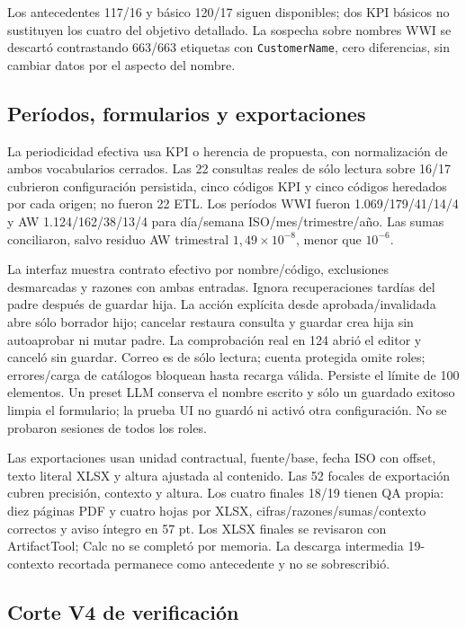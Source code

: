 \documentclass[11pt,letterpaper]{article}
\newcommand{\file}[1]{\texttt{#1}}
\begin{document}
Los antecedentes 117/16 y básico 120/17 siguen disponibles; dos KPI básicos no
sustituyen los cuatro del objetivo detallado. La sospecha sobre nombres WWI se
descartó contrastando 663/663 etiquetas con \file{CustomerName}, cero diferencias,
sin cambiar datos por el aspecto del nombre.

\subsection{Períodos, formularios y exportaciones}

La periodicidad efectiva usa KPI o herencia de propuesta, con normalización de
ambos vocabularios cerrados. Las 22 consultas reales de sólo lectura sobre 16/17
cubrieron configuración persistida, cinco códigos KPI y cinco códigos heredados
por cada origen; no fueron 22 ETL. Los períodos WWI fueron 1.069/179/41/14/4 y AW
1.124/162/38/13/4 para día/semana ISO/mes/trimestre/año. Las sumas conciliaron,
salvo residuo AW trimestral \(1{,}49\times10^{-8}\), menor que \(10^{-6}\).

La interfaz muestra contrato efectivo por nombre/código, exclusiones desmarcadas
y razones con ambas entradas. Ignora recuperaciones tardías del padre después de
guardar hija. La acción explícita desde aprobada/invalidada abre sólo borrador
hijo; cancelar restaura consulta y guardar crea hija sin autoaprobar ni mutar padre.
La comprobación real en 124 abrió el editor y canceló sin guardar. Correo es de
sólo lectura; cuenta protegida omite roles; errores/carga de catálogos bloquean
hasta recarga válida. Persiste el límite de 100 elementos. Un preset LLM conserva
el nombre escrito y sólo un guardado exitoso limpia el formulario; la prueba UI
no guardó ni activó otra configuración. No se probaron sesiones de todos los roles.

Las exportaciones usan unidad contractual, fuente/base, fecha ISO con offset,
texto literal XLSX y altura ajustada al contenido. Las 52 focales de exportación
cubren precisión, contexto y altura. Los cuatro finales 18/19 tienen QA propia:
diez páginas PDF y cuatro hojas por XLSX, cifras/razones/sumas/contexto correctos
y aviso íntegro en 57 pt. Los XLSX finales se revisaron con ArtifactTool; Calc no
se completó por memoria. La descarga intermedia 19-contexto recortada permanece
como antecedente y no se sobrescribió.

\subsection{Corte V4 de verificación}
\end{document}
